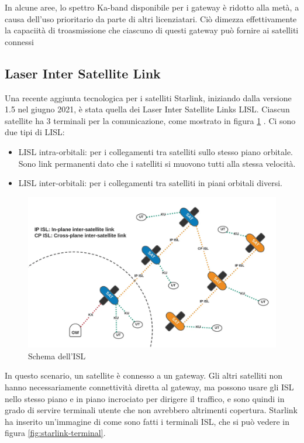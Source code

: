 In alcune aree, lo spettro \ac{Ka}-band disponibile per i gateway è ridotto alla metà, a causa dell'uso prioritario da parte di altri licenziatari. Ciò dimezza effettivamente la capaciità di troasmissione che ciascuno di questi gateway può fornire ai satelliti connessi \cite{mike_puchol_modeling_2022}

\subsection{Laser Inter Satellite Link}

Una recente aggiunta tecnologica per i satelliti Starlink, iniziando dalla versione 1.5 nel giugno 2021, è stata quella dei Laser Inter Satellite Links \ac{LISL}.
Ciascun satellite ha 3 terminali per la comunicazione, come mostrato in figura \ref{fig:starlink-ISL} \cite{mike_puchol_modeling_2022} \cite{chaudhry_laser_2021}.
Ci sono due tipi di \ac{LISL}:
\begin{itemize}
  \item \ac{LISL} intra-orbitali: per i collegamenti tra satelliti sullo stesso piano orbitale. Sono link permanenti dato che i satelliti si muovono tutti alla stessa velocità.
  \item \ac{LISL} inter-orbitali: per i collegamenti tra satelliti in piani orbitali diversi.
\end{itemize}

\begin{figure}[htbp]
  \centering
  \includegraphics[width=0.9\linewidth]{./res/img/LISL_scheme.png}
  \caption{Schema dell'\ac{ISL} \cite{mike_puchol_modeling_2022}}
  \label{fig:starlink-ISL}
\end{figure}

In questo scenario, un satellite è connesso a un gateway.
Gli altri satelliti non hanno necessariamente connettività diretta al gateway, ma possono usare gli \ac{ISL} nello stesso piano e in piano incrociato per dirigere il traffico, e sono quindi in grado di servire terminali utente che non avrebbero altrimenti copertura.
Starlink ha inserito un'immagine di come sono fatti i terminali \ac{ISL}, che si può vedere in figura \ref{fig:starlink-terminal}.

